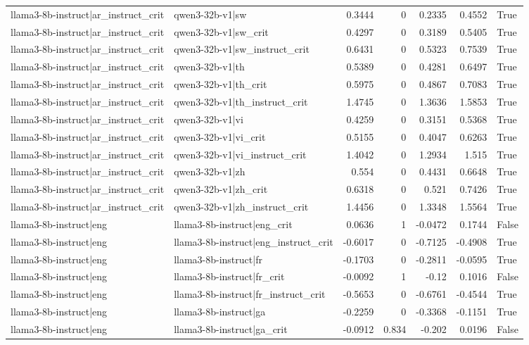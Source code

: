 \begin{table}
\begin{tabular}{l l r r r r l}
llama3-8b-instruct|ar_instruct_crit & qwen3-32b-v1|sw & 0.3444 & 0 & 0.2335 & 0.4552 & True \\
llama3-8b-instruct|ar_instruct_crit & qwen3-32b-v1|sw_crit & 0.4297 & 0 & 0.3189 & 0.5405 & True \\
llama3-8b-instruct|ar_instruct_crit & qwen3-32b-v1|sw_instruct_crit & 0.6431 & 0 & 0.5323 & 0.7539 & True \\
llama3-8b-instruct|ar_instruct_crit & qwen3-32b-v1|th & 0.5389 & 0 & 0.4281 & 0.6497 & True \\
llama3-8b-instruct|ar_instruct_crit & qwen3-32b-v1|th_crit & 0.5975 & 0 & 0.4867 & 0.7083 & True \\
llama3-8b-instruct|ar_instruct_crit & qwen3-32b-v1|th_instruct_crit & 1.4745 & 0 & 1.3636 & 1.5853 & True \\
llama3-8b-instruct|ar_instruct_crit & qwen3-32b-v1|vi & 0.4259 & 0 & 0.3151 & 0.5368 & True \\
llama3-8b-instruct|ar_instruct_crit & qwen3-32b-v1|vi_crit & 0.5155 & 0 & 0.4047 & 0.6263 & True \\
llama3-8b-instruct|ar_instruct_crit & qwen3-32b-v1|vi_instruct_crit & 1.4042 & 0 & 1.2934 & 1.515 & True \\
llama3-8b-instruct|ar_instruct_crit & qwen3-32b-v1|zh & 0.554 & 0 & 0.4431 & 0.6648 & True \\
llama3-8b-instruct|ar_instruct_crit & qwen3-32b-v1|zh_crit & 0.6318 & 0 & 0.521 & 0.7426 & True \\
llama3-8b-instruct|ar_instruct_crit & qwen3-32b-v1|zh_instruct_crit & 1.4456 & 0 & 1.3348 & 1.5564 & True \\
llama3-8b-instruct|eng & llama3-8b-instruct|eng_crit & 0.0636 & 1 & -0.0472 & 0.1744 & False \\
llama3-8b-instruct|eng & llama3-8b-instruct|eng_instruct_crit & -0.6017 & 0 & -0.7125 & -0.4908 & True \\
llama3-8b-instruct|eng & llama3-8b-instruct|fr & -0.1703 & 0 & -0.2811 & -0.0595 & True \\
llama3-8b-instruct|eng & llama3-8b-instruct|fr_crit & -0.0092 & 1 & -0.12 & 0.1016 & False \\
llama3-8b-instruct|eng & llama3-8b-instruct|fr_instruct_crit & -0.5653 & 0 & -0.6761 & -0.4544 & True \\
llama3-8b-instruct|eng & llama3-8b-instruct|ga & -0.2259 & 0 & -0.3368 & -0.1151 & True \\
llama3-8b-instruct|eng & llama3-8b-instruct|ga_crit & -0.0912 & 0.834 & -0.202 & 0.0196 & False \\

\end{tabular}
\end{table}
